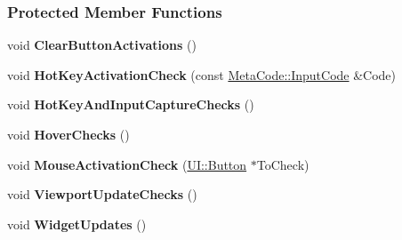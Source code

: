 \subsubsection*{Protected Member Functions}
\begin{DoxyCompactItemize}
\item 
\hypertarget{classphys_1_1UIManager_a6ad508c48abf98bfccf3d04cd46d4f77}{
void {\bfseries ClearButtonActivations} ()}
\label{classphys_1_1UIManager_a6ad508c48abf98bfccf3d04cd46d4f77}

\item 
\hypertarget{classphys_1_1UIManager_a8340da0109e0c473af342ab4a514afc2}{
void {\bfseries HotKeyActivationCheck} (const \hyperlink{classphys_1_1MetaCode_a3e501cbb5bf0f6f1fdb7211465bda8d8}{MetaCode::InputCode} \&Code)}
\label{classphys_1_1UIManager_a8340da0109e0c473af342ab4a514afc2}

\item 
\hypertarget{classphys_1_1UIManager_aafbc4428f35b8ec2be7cff6fd0b534d1}{
void {\bfseries HotKeyAndInputCaptureChecks} ()}
\label{classphys_1_1UIManager_aafbc4428f35b8ec2be7cff6fd0b534d1}

\item 
\hypertarget{classphys_1_1UIManager_ae5beaafe73c68d39eb84463033941057}{
void {\bfseries HoverChecks} ()}
\label{classphys_1_1UIManager_ae5beaafe73c68d39eb84463033941057}

\item 
\hypertarget{classphys_1_1UIManager_af1e9285e30826b1c075bb8ca17fcc31e}{
void {\bfseries MouseActivationCheck} (\hyperlink{classphys_1_1UI_1_1Button}{UI::Button} $\ast$ToCheck)}
\label{classphys_1_1UIManager_af1e9285e30826b1c075bb8ca17fcc31e}

\item 
\hypertarget{classphys_1_1UIManager_aba919b3f29058271e4681f9ca7a8a17e}{
void {\bfseries ViewportUpdateChecks} ()}
\label{classphys_1_1UIManager_aba919b3f29058271e4681f9ca7a8a17e}

\item 
\hypertarget{classphys_1_1UIManager_aefbf6f02f0b1049c321139fa399eb7ee}{
void {\bfseries WidgetUpdates} ()}
\label{classphys_1_1UIManager_aefbf6f02f0b1049c321139fa399eb7ee}

\end{DoxyCompactItemize}
